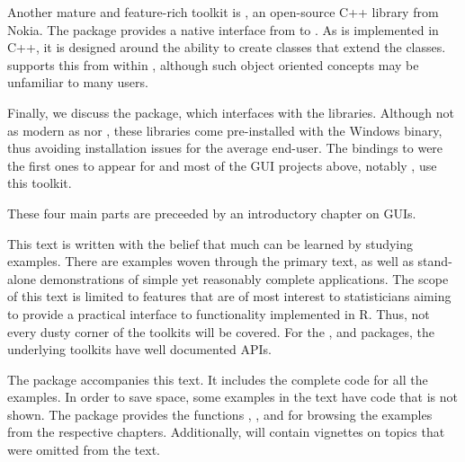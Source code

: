 Another mature and feature-rich toolkit is \Qt, an open-source C++ library
from Nokia. The \R\/ package  provides a native interface
from \R\/ to \Qt.  As \Qt\/ is implemented in C++, it is designed
around the ability to create classes that extend the \Qt\/
classes.  supports this from within \R\/, although such
object oriented concepts may be unfamiliar to many \R\/ users.

Finally, we discuss the  package, which interfaces with the
\TK\/ libraries. Although not as modern as \GTK\/ nor \Qt, these
libraries come pre-installed with the Windows binary, thus avoiding
installation issues for the average end-user. The bindings to \TK\/
were the first ones to appear for \R\/ and most of the GUI projects
above, notably , use this toolkit.

These four main parts are preceeded by an introductory chapter on GUIs.

This text is written with the belief that much can be learned by
studying examples. There are examples woven through the primary text,
as well as stand-alone demonstrations of simple yet reasonably
complete applications. The scope of this text is limited to features
that are of most interest to statisticians aiming to provide a
practical interface to functionality implemented in R. Thus, not every
dusty corner of the toolkits will be covered. For the ,
 and  packages, the underlying toolkits have
well documented APIs.

The package \pkg{\PACKAGENAME} accompanies this text. It includes the
complete code for all the examples. In order to save space, some
examples in the text have code that is not shown. The package provides
the functions , ,
 and  for browsing the
examples from the respective chapters. Additionally,
\pkg{\PACKAGENAME} will contain vignettes on topics that were omitted
from the text.


